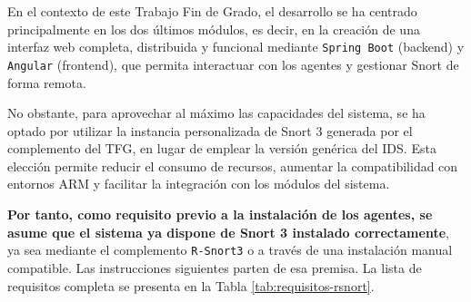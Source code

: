 \documentclass[11pt,a4paper,twoside]{report}
\begin{document}
En el contexto de este Trabajo Fin de Grado, el desarrollo se ha centrado principalmente en los dos últimos módulos, es decir, en la creación de una interfaz web completa, distribuida y funcional mediante \texttt{Spring Boot} (backend) y \texttt{Angular} (frontend), que permita interactuar con los agentes y gestionar Snort de forma remota.\newline

No obstante, para aprovechar al máximo las capacidades del sistema, se ha optado por utilizar la instancia personalizada de Snort 3 generada por el complemento del TFG, en lugar de emplear la versión genérica del IDS. Esta elección permite reducir el consumo de recursos, aumentar la compatibilidad con entornos ARM y facilitar la integración con los módulos del sistema.\newline

\textbf{Por tanto, como requisito previo a la instalación de los agentes, se asume que el sistema ya dispone de Snort 3 instalado correctamente}, ya sea mediante el complemento \texttt{R-Snort3} o a través de una instalación manual compatible. Las instrucciones siguientes parten de esa premisa. La lista de requisitos completa se presenta en la Tabla \ref{tab:requisitos-rsnort}.

\newpage
\end{document}
